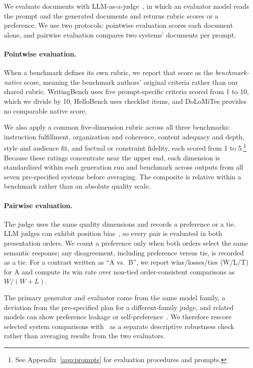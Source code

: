 We evaluate documents with LLM-as-a-judge~\citep{zheng2023judging}, in which an evaluator model reads the prompt and the generated documents and returns rubric scores or a preference.
We use two protocols: pointwise evaluation scores each document alone, and pairwise evaluation compares two systems' documents per prompt.

\paragraph{Pointwise evaluation.}
When a benchmark defines its own rubric, we report that score as the \emph{benchmark-native} score, meaning the benchmark authors' original criteria rather than our shared rubric.
WritingBench uses five prompt-specific criteria scored from 1 to 10, which we divide by 10, HelloBench uses checklist items, and DoLoMiTes provides no comparable native score.

We also apply a common five-dimension rubric across all three benchmarks: instruction fulfillment, organization and coherence, content adequacy and depth, style and audience fit, and factual or constraint fidelity, each scored from 1 to 5.\footnote{See Appendix~\ref{app:prompts} for evaluation procedures and prompts.}
Because these ratings concentrate near the upper end, each dimension is standardized within each generation run and benchmark across outputs from all seven pre-specified systems before averaging.
The composite is relative within a benchmark rather than an absolute quality scale.

\paragraph{Pairwise evaluation.}
The judge uses the same quality dimensions and records a preference or a tie.
LLM judges can exhibit position bias~\citep{zheng2023judging,wang2024fair}, so every pair is evaluated in both presentation orders.
We count a preference only when both orders select the same semantic response; any disagreement, including preference versus tie, is recorded as a tie.
For a contrast written as ``A vs.\ B'', we report wins/losses/ties (W/L/T) for A and compute its win rate over non-tied order-consistent comparisons as $W/(W+L)$.

The primary generator and evaluator come from the same model family, a deviation from the pre-specified plan for a different-family judge, and related models can show preference leakage or self-preference~\citep{li2026preference,panickssery2024selfpreference}.
We therefore rescore selected system comparisons with \modelCross\ as a separate descriptive robustness check rather than averaging results from the two evaluators.


